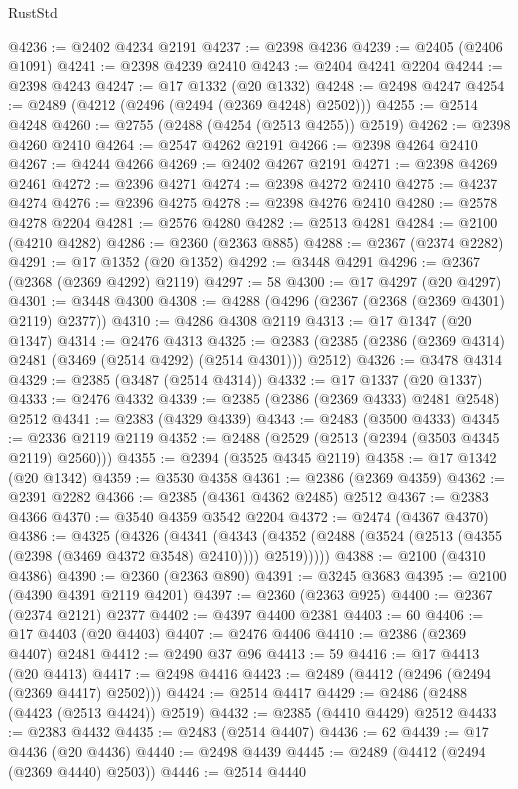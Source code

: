 \begin{lexlean}{RustStd}
\begin{coremodule}
@4236 := @2402 @4234 @2191
@4237 := @2398 @4236
@4239 := @2405 (@2406 @1091)
@4241 := @2398 @4239 @2410
@4243 := @2404 @4241 @2204
@4244 := @2398 @4243
@4247 := @17 @1332 (@20 @1332)
@4248 := @2498 @4247
@4254 := @2489 (@4212 (@2496 (@2494 (@2369 @4248) @2502)))
@4255 := @2514 @4248
@4260 := @2755 (@2488 (@4254 (@2513 @4255)) @2519)
@4262 := @2398 @4260 @2410
@4264 := @2547 @4262 @2191
@4266 := @2398 @4264 @2410
@4267 := @4244 @4266
@4269 := @2402 @4267 @2191
@4271 := @2398 @4269 @2461
@4272 := @2396 @4271
@4274 := @2398 @4272 @2410
@4275 := @4237 @4274
@4276 := @2396 @4275
@4278 := @2398 @4276 @2410
@4280 := @2578 @4278 @2204
@4281 := @2576 @4280
@4282 := @2513 @4281
@4284 := @2100 (@4210 @4282)
@4286 := @2360 (@2363 @885)
@4288 := @2367 (@2374 @2282)
@4291 := @17 @1352 (@20 @1352)
@4292 := @3448 @4291
@4296 := @2367 (@2368 (@2369 @4292) @2119)
@4297 := 58
@4300 := @17 @4297 (@20 @4297)
@4301 := @3448 @4300
@4308 := @4288 (@4296 (@2367 (@2368 (@2369 @4301) @2119) @2377))
@4310 := @4286 @4308 @2119
@4313 := @17 @1347 (@20 @1347)
@4314 := @2476 @4313
@4325 := @2383 (@2385 (@2386 (@2369 @4314) @2481 (@3469 (@2514 @4292) (@2514 @4301))) @2512)
@4326 := @3478 @4314
@4329 := @2385 (@3487 (@2514 @4314))
@4332 := @17 @1337 (@20 @1337)
@4333 := @2476 @4332
@4339 := @2385 (@2386 (@2369 @4333) @2481 @2548) @2512
@4341 := @2383 (@4329 @4339)
@4343 := @2483 (@3500 @4333)
@4345 := @2336 @2119 @2119
@4352 := @2488 (@2529 (@2513 (@2394 (@3503 @4345 @2119) @2560)))
@4355 := @2394 (@3525 @4345 @2119)
@4358 := @17 @1342 (@20 @1342)
@4359 := @3530 @4358
@4361 := @2386 (@2369 @4359)
@4362 := @2391 @2282
@4366 := @2385 (@4361 @4362 @2485) @2512
@4367 := @2383 @4366
@4370 := @3540 @4359 @3542 @2204
@4372 := @2474 (@4367 @4370)
@4386 := @4325
    (@4326
      (@4341
        (@4343 (@4352 (@2488 (@3524 (@2513 (@4355 (@2398 (@3469 @4372 @3548) @2410)))) @2519)))))
@4388 := @2100 (@4310 @4386)
@4390 := @2360 (@2363 @890)
@4391 := @3245 @3683
@4395 := @2100 (@4390 @4391 @2119 @4201)
@4397 := @2360 (@2363 @925)
@4400 := @2367 (@2374 @2121) @2377
@4402 := @4397 @4400 @2381
@4403 := 60
@4406 := @17 @4403 (@20 @4403)
@4407 := @2476 @4406
@4410 := @2386 (@2369 @4407) @2481
@4412 := @2490 @37 @96
@4413 := 59
@4416 := @17 @4413 (@20 @4413)
@4417 := @2498 @4416
@4423 := @2489 (@4412 (@2496 (@2494 (@2369 @4417) @2502)))
@4424 := @2514 @4417
@4429 := @2486 (@2488 (@4423 (@2513 @4424)) @2519)
@4432 := @2385 (@4410 @4429) @2512
@4433 := @2383 @4432
@4435 := @2483 (@2514 @4407)
@4436 := 62
@4439 := @17 @4436 (@20 @4436)
@4440 := @2498 @4439
@4445 := @2489 (@4412 (@2494 (@2369 @4440) @2503))
@4446 := @2514 @4440

\end{coremodule}
\end{lexlean}

